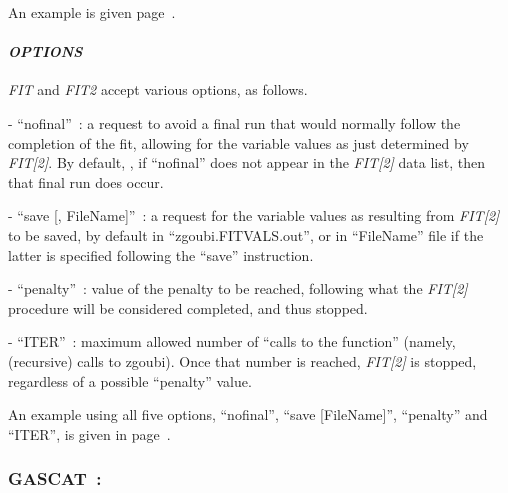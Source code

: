 An example is given page~\pageref{ExaFITREBELOTE}. 



\bigskip

\paragraph{\textit{OPTIONS} }

\noindent \textsl{FIT} and \textsl{FIT2} accept various options, as follows. 

\smallskip

\noindent - ``nofinal''~:  \label{nofinal}
a request to avoid a final run that would normally follow the completion of the fit, allowing for the 
variable values as just determined by \textsl{FIT[2]}. By default, \ie, if ``nofinal'' does 
not appear in the   \textsl{FIT[2]} data list, then that final run does occur. 

\smallskip

\noindent - ``save [, FileName]''~: a request for the variable values as resulting from  \textsl{FIT[2]} to be saved, by 
default in ``zgoubi.FITVALS.out'', or in ``FileName'' file if the latter is specified following the ``save'' instruction.

\smallskip

\noindent - ``penalty''~: value of the penalty to be reached, following what the  \textsl{FIT[2]} procedure 
will be considered completed, and thus  stopped. 

\smallskip

\noindent - ``ITER''~: maximum allowed number of ``calls to the function'' (namely, (recursive) calls to zgoubi). Once that number is reached, 
 \textsl{FIT[2]} is stopped, regardless of a possible ``penalty'' value. 

\medskip

\noindent An example using all five options, ``nofinal'', ``save [FileName]'', ``penalty'' and ``ITER'', 
is given in page~\pageref{FITOptionsExa}. 








\newpage

\subsubsection*{GASCAT~: \GASCATTitl} \label{GASCAT}
\medskip

